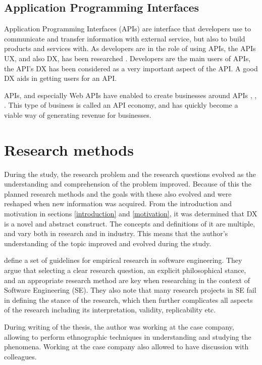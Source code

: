 \documentclass[english, 12pt, a4paper, sci, utf8, a-1b, online]{aaltothesis}
\begin{document}
\subsection{Application Programming Interfaces}

Application Programming Interfaces (APIs) are interface that developers use to communicate and transfer information with external service, but also to build products and services with. As developers are in the role of using APIs, the APIs UX, and also DX, has been researched \citep{api-designers}. Developers are the main users of APIs, the API's DX has been considered as a very important aspect of the API. A good DX aids in getting users for an API.

APIs, and especially Web APIs have enabled to create businesses around APIs \citep{api-ecosystem}, \citep{web-api-economy}, \citep{moilanen2018api}. This type of business is called an API economy, and has quickly become a viable way of generating revenue for businesses.

\clearpage
\section{Research methods}

During the study, the research problem and the research questions evolved as the understanding and comprehension of the problem improved. Because of this the planned research methods and the goals with these also evolved and were reshaped when new information was acquired. From the introduction and motivation in sections \ref{introduction} and \ref{motivation}, it was determined that DX is a novel and abstract construct. The concepts and definitions of it are multiple, and vary both in research and in industry. This means that the author's understanding of the topic improved and evolved during the study.

\cite{easterbrook2008selecting} define a set of guidelines for empirical research in software engineering. They argue that selecting a clear research question, an explicit philosophical stance, and an appropriate research method are key when researching in the context of Software Engineering (SE). They also note that many research projects in SE fail in defining the stance of the research, which then further complicates all aspects of the research including its interpretation, validity, replicability etc.

During writing of the thesis, the author was working at the case company, allowing to perform ethnographic techniques in understanding and studying the phenomena. Working at the case company also allowed to have discussion with colleagues.
\end{document}
